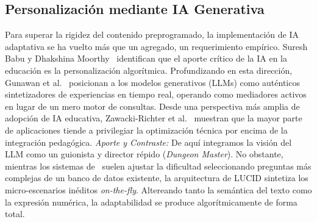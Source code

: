 \documentclass{ieeetj}
\begin{document}
\subsection{Personalizaci\'on mediante IA Generativa}
Para superar la rigidez del contenido preprogramado, la implementaci\'on de IA adaptativa se ha vuelto
m\'as que un agregado, un requerimiento emp\'irico. Suresh Babu y Dhakshina Moorthy~\cite{suresh2024application} identifican que
el aporte cr\'itico de la IA en la educaci\'on es la personalizaci\'on algor\'itmica. Profundizando
en esta direcci\'on, Gunawan et al.~\cite{gunawan2025future} posicionan a los modelos generativos
(LLMs) como aut\'enticos sintetizadores de experiencias en tiempo real, operando como mediadores activos en
lugar de un mero motor de consultas. Desde una perspectiva m\'as amplia de adopci\'on de IA educativa,
Zawacki-Richter et al.~\cite{zawacki2019systematic} muestran que la mayor parte de aplicaciones
tiende a privilegiar la optimizaci\'on t\'ecnica por encima de la integraci\'on pedag\'ogica.
\textit{Aporte y Contraste:} De aqu\'i integramos la visi\'on del LLM como un guionista y director r\'epido
(\textit{Dungeon Master}). No obstante, mientras los sistemas de~\cite{suresh2024application} suelen ajustar
la dificultad seleccionando preguntas m\'as complejas de un banco de datos existente, la arquitectura
de LUCID sintetiza los micro-escenarios in\'editos \textit{on-the-fly}. Altereando tanto la sem\'antica del 
texto como la expresi\'on num\'erica, la adaptabilidad se produce algor\'itmicamente de forma total.
\end{document}
